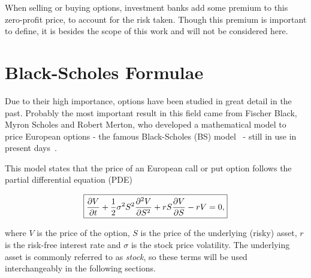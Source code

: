 When selling or buying options, investment banks add some premium to this zero-profit price, to account for the risk taken. Though this premium is important to define, it is besides the scope of this work and will not be considered here.
    
\section{Black-Scholes Formulae}
\label{section:Black-Scholes Formulae}
Due to their high importance, options have been studied in great detail in the past.
Probably the most important result in this field came from Fischer Black, Myron Scholes and Robert Merton, who developed a mathematical model to price European options - the famous Black-Scholes (BS) model~\citep{Scholes} - still in use in present days~\citep{Wilmott3}.

This model states that the price of an European call or put option follows the partial differential equation (PDE)

\begin{equation}\label{BS2}
\boxed{\pdv{V}{t}+\frac{1}{2}\sigma^2S^2\pdv{^2V}{S^2}+rS\pdv{V}{S}-rV=0,}
\end{equation}

\noindent where $V$ is the price of the option, $S$ is the price of the underlying (risky) asset, $r$ is the risk-free interest rate and $\sigma$ is the stock price volatility.
The underlying asset is commonly referred to as \emph{stock}, so these terms will be used interchangeably in the following sections.

